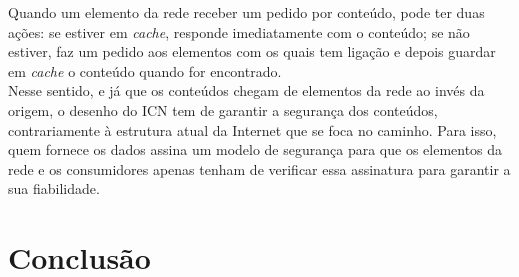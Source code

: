 \documentclass[conference]{IEEEtran}
\begin{document}
Quando um elemento da rede receber um pedido por conte\'{u}do, pode ter duas a\c{c}\~{o}es: se estiver em \textit{cache}, responde imediatamente com o conte\'{u}do; se n\~{a}o estiver, faz um pedido aos elementos com os quais tem liga\c{c}\~{a}o e depois guardar em \textit{cache} o conte\'{u}do quando for encontrado\cite{surveyICN}.\\

Nesse sentido, e j\'{a} que os conte\'{u}dos chegam de elementos da rede ao inv\'{e}s da origem, o desenho do ICN tem de garantir a seguran\c{c}a dos conte\'{u}dos, contrariamente \`{a} estrutura atual da Internet que se foca no caminho. Para isso, quem fornece os dados assina um modelo de seguran\c{c}a para que os elementos da rede e os consumidores apenas tenham de verificar essa assinatura para garantir a sua fiabilidade\cite{icnForest}.\\

\section{Conclus\~{a}o}


\IEEEtriggercmd{\enlargethispage{-5in}}



\end{document}
